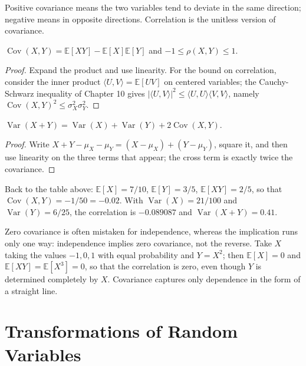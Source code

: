 Positive covariance means the two variables tend to deviate in the same direction;
negative means in opposite directions. Correlation is the unitless version of covariance.

\begin{proposisi}
$\operatorname{Cov}(X,Y)=\mathbb{E}[XY]-\mathbb{E}[X]\mathbb{E}[Y]$ and
$-1\le\rho(X,Y)\le1$.
\end{proposisi}

\begin{proof}
Expand the product and use linearity. For the bound on correlation, consider the inner product
$\langle U,V\rangle=\mathbb{E}[UV]$ on centered variables; the Cauchy-Schwarz
inequality of Chapter 10 gives
$|\langle U,V\rangle|^2\le\langle U,U\rangle\langle V,V\rangle$, namely
$\operatorname{Cov}(X,Y)^2\le\sigma_X^2\sigma_Y^2$.
\end{proof}

\begin{teorema}
$\operatorname{Var}(X+Y)=\operatorname{Var}(X)+\operatorname{Var}(Y)
+2\operatorname{Cov}(X,Y)$.
\end{teorema}

\begin{proof}
Write $X+Y-\mu_X-\mu_Y=(X-\mu_X)+(Y-\mu_Y)$, square it, and then use linearity on
the three terms that appear; the cross term is exactly twice the covariance.
\end{proof}

Back to the table above: $\mathbb{E}[X]=7/10$, $\mathbb{E}[Y]=3/5$,
$\mathbb{E}[XY]=2/5$, so that $\operatorname{Cov}(X,Y)=-1/50=-0.02$. With
$\operatorname{Var}(X)=21/100$ and $\operatorname{Var}(Y)=6/25$, the correlation is
$-0.089087$ and $\operatorname{Var}(X+Y)=0.41$.

Zero covariance is often mistaken for independence, whereas the implication runs only one way:
independence implies zero covariance, not the reverse. Take $X$ taking the values $-1,0,1$ with
equal probability and $Y=X^2$; then $\mathbb{E}[X]=0$ and
$\mathbb{E}[XY]=\mathbb{E}[X^3]=0$, so that the correlation is zero, even though $Y$ is determined
completely by $X$. Covariance captures only dependence in the form of a straight line.


\section{Transformations of Random Variables}

